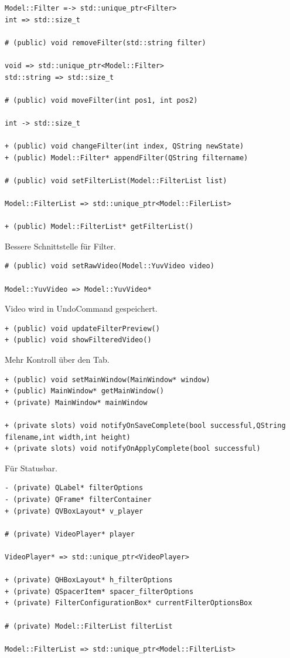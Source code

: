 \documentclass{scrartcl}
\begin{document}
{\begin{verbatim}
Model::Filter =-> std::unique_ptr<Filter>
int => std::size_t

# (public) void removeFilter(std::string filter)

void => std::unique_ptr<Model::Filter>
std::string => std::size_t

# (public) void moveFilter(int pos1, int pos2)

int -> std::size_t

+ (public) void changeFilter(int index, QString newState)
+ (public) Model::Filter* appendFilter(QString filtername)

# (public) void setFilterList(Model::FilterList list)

Model::FilterList => std::unique_ptr<Model::FilerList>

+ (public) Model::FilterList* getFilterList()
\end{verbatim}
Bessere Schnittstelle für Filter.
\bigskip
\begin{verbatim}
# (public) void setRawVideo(Model::YuvVideo video)

Model::YuvVideo => Model::YuvVideo*
\end{verbatim}
Video wird in UndoCommand gespeichert.
\newpage
\begin{verbatim}
+ (public) void updateFilterPreview()
+ (public) void showFilteredVideo()
\end{verbatim}
Mehr Kontroll über den Tab.
\bigskip
\begin{verbatim}
+ (public) void setMainWindow(MainWindow* window)
+ (public) MainWindow* getMainWindow()
+ (private) MainWindow* mainWindow

+ (private slots) void notifyOnSaveComplete(bool successful,QString filename,int width,int height)
+ (private slots) void notifyOnApplyComplete(bool successful)
\end{verbatim}
Für Statusbar.
\bigskip
\begin{verbatim}
- (private) QLabel* filterOptions
- (private) QFrame* filterContainer
+ (private) QVBoxLayout* v_player

# (private) VideoPlayer* player

VideoPlayer* => std::unique_ptr<VideoPlayer>

+ (private) QHBoxLayout* h_filterOptions
+ (private) QSpacerItem* spacer_filterOptions
+ (private) FilterConfigurationBox* currentFilterOptionsBox
	
# (private) Model::FilterList filterList
	
Model::FilterList => std::unique_ptr<Model::FilterList>
	

\end{verbatim}}
\end{document}

